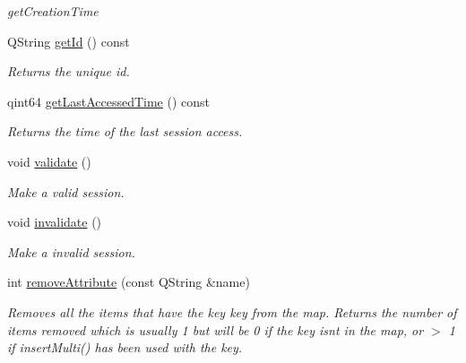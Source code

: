 \begin{DoxyCompactItemize}
\begin{DoxyCompactList}\small\item\em get\+Creation\+Time \end{DoxyCompactList}\item 
\mbox{\label{class_http_session_a358bfe548463d39bbdc167bd8c630edc}} 
Q\+String \hyperlink{class_http_session_a358bfe548463d39bbdc167bd8c630edc}{get\+Id} () const
\begin{DoxyCompactList}\small\item\em Returns the unique id. \end{DoxyCompactList}\item 
\mbox{\label{class_http_session_a539bf0c99bad1aae86ff9b8f411740e1}} 
qint64 \hyperlink{class_http_session_a539bf0c99bad1aae86ff9b8f411740e1}{get\+Last\+Accessed\+Time} () const
\begin{DoxyCompactList}\small\item\em Returns the time of the last session access. \end{DoxyCompactList}\item 
\mbox{\label{class_http_session_adc118d02431eec30977bd1cb3429eb79}} 
void \hyperlink{class_http_session_adc118d02431eec30977bd1cb3429eb79}{validate} ()
\begin{DoxyCompactList}\small\item\em Make a valid session. \end{DoxyCompactList}\item 
\mbox{\label{class_http_session_a1656b24f54bcd539f01022323a3c3b3c}} 
void \hyperlink{class_http_session_a1656b24f54bcd539f01022323a3c3b3c}{invalidate} ()
\begin{DoxyCompactList}\small\item\em Make a invalid session. \end{DoxyCompactList}\item 
\mbox{\label{class_http_session_a9102eedc7002a96cd64c080af9c4ac47}} 
int \hyperlink{class_http_session_a9102eedc7002a96cd64c080af9c4ac47}{remove\+Attribute} (const Q\+String \&name)
\begin{DoxyCompactList}\small\item\em Removes all the items that have the key key from the map. Returns the number of items removed which is usually 1 but will be 0 if the key isn\textquotesingle{}t in the map, or $>$ 1 if insert\+Multi() has been used with the key. \end{DoxyCompactList}\item 

\end{DoxyCompactItemize}
